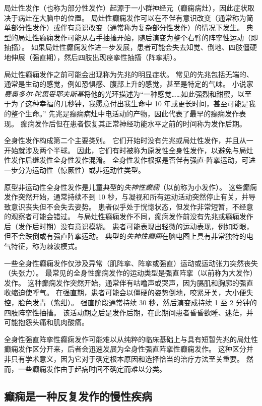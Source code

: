 局灶性发作（也称为部分性发作）起源于一小群神经元（癫痫病灶），因此症状取决于病灶在大脑中的位置。
局灶性癫痫发作可以在不伴有意识改变（通常称为简单部分性发作）或伴有意识改变（通常称为复杂部分性发作）的情况下发生。
典型的局灶性癫痫发作可能从右手抽搐开始，随后演变为整个右臂的阵挛性运动（即抽搐）。
如果局灶性癫痫发作进一步发展，患者可能会失去知觉、倒地、四肢僵硬地伸展（强直期），然后四肢出现痉挛性抽搐（阵挛期）。


局灶性癫痫发作之前可能会出现称为先兆的明显症状。
常见的先兆包括无端的、通常是生动的感觉，例如恐惧感、腹部上升的感觉，甚至是特定的气味。
小说家\textit{费奥多尔$\cdot$陀思妥耶夫斯基}将他的光环描述为“一种感觉……如此强烈和甜蜜，以至于为了这种幸福的几秒钟，我愿意付出我生命中 10 年或更长时间，甚至可能是我的整个生命。” 
先兆是癫痫病灶中电活动的产物，因此代表了最早的癫痫发作表现。
癫痫发作后但在患者恢复其正常神经功能水平之前的时间称为发作后期。


全身性发作构成第二个主要类别。
它们开始时没有先兆或局灶性发作，并且从一开始就涉及两个半球。
因此，它们有时被称为原发性全身性发作，以避免与局灶性发作后继发性全身性发作混淆。
全身性发作根据是否伴有强直-阵挛运动，可进一步分为运动性（惊厥性）或非运动性类型。


原型非运动性全身性发作是儿童典型的\textit{失神性癫痫}（以前称为小发作）。
这些癫痫发作突然开始，通常持续不到 10 秒，与凝视和所有运动活动突然停止有关，并导致意识丧失但不会失去姿势。
患者似乎处于恍惚状态，但发作非常短暂，不经意的观察者可能会错过。
与局灶性癫痫发作不同，癫痫发作前没有先兆或癫痫发作后（发作后时期）没有意识模糊。
患者可能表现出轻微的运动表现，例如眨眼，但不会跌倒或有强直阵挛运动。
典型的\textit{失神性癫痫}在脑电图上具有非常独特的电气特征，称为棘波模式。


一些全身性癫痫发作仅涉及异常（肌阵挛、阵挛或强直）运动或运动张力突然丧失（失张力）。
最常见的全身性癫痫发作的运动类型是强直阵挛（以前称为大发作）发作。
这种癫痫发作突然开始，通常伴有咕噜声或哭声，因为膈肌和胸廓的强直收缩迫使呼气。
在强直期，患者可能会以僵硬的姿势倒地，咬紧牙关，大小便失控，脸色发青（紫绀）。
强直阶段通常持续 30 秒，然后演变成持续 1 至 2 分钟的四肢阵挛性抽搐。
该活动期之后是发作后期，在此期间患者昏昏欲睡、迷茫，并可能抱怨头痛和肌肉酸痛。


全身性强直阵挛性癫痫发作可能难以从纯粹的临床基础上与具有短暂先兆的局灶性癫痫发作区分开来，后者会迅速发展为全身性强直阵挛性癫痫发作。
这种区分并非只有学术意义，因为它对于确定根本原因和选择恰当的治疗方法至关重要。
然而，一些癫痫发作由于起病时间不确定而难以分类。



\subsection{癫痫是一种反复发作的慢性疾病}

